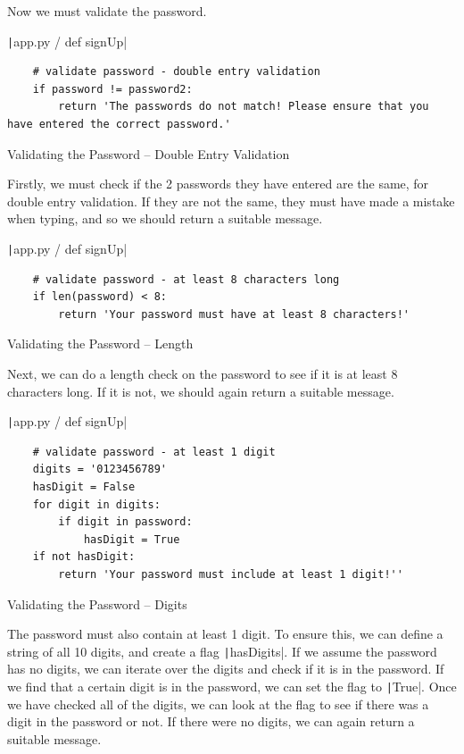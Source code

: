 \documentclass[12pt]{report}
\newcommand{\pil}[1]{\protect\texttt|#1|}
\begin{document}
Now we must validate the password.

\begin{listing}[H]
\pil{app.py / def signUp}
\begin{verbatim}
    # validate password - double entry validation
    if password != password2:
        return 'The passwords do not match! Please ensure that you have entered the correct password.'
\end{verbatim}
\caption{Validating the Password -- Double Entry Validation}\label{cs:validatePasswordDoubleEntry}
\end{listing}

Firstly, we must check if the 2 passwords they have entered are the same, for double entry validation. If they are not the same, they must have made a mistake when typing, and so we should return a suitable message.

\begin{listing}[H]
\pil{app.py / def signUp}
\begin{verbatim}
    # validate password - at least 8 characters long
    if len(password) < 8:
        return 'Your password must have at least 8 characters!'
\end{verbatim}
\caption{Validating the Password -- Length}\label{cs:validatePasswordLength}
\end{listing}

Next, we can do a length check on the password to see if it is at least 8 characters long. If it is not, we should again return a suitable message.

\begin{listing}[H]
\pil{app.py / def signUp}
\begin{verbatim}
    # validate password - at least 1 digit
    digits = '0123456789'
    hasDigit = False
    for digit in digits:
        if digit in password:
            hasDigit = True
    if not hasDigit:
        return 'Your password must include at least 1 digit!''
\end{verbatim}
\caption{Validating the Password -- Digits}\label{cs:validatePasswordDigits}
\end{listing}

The password must also contain at least 1 digit. To ensure this, we can define a string of all 10 digits, and create a flag \pil{hasDigits}. If we assume the password has no digits, we can iterate over the digits and check if it is in the password. If we find that a certain digit is in the password, we can set the flag to \pil{True}. Once we have checked all of the digits, we can look at the flag to see if there was a digit in the password or not. If there were no digits, we can again return a suitable message.
\end{document}
